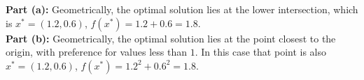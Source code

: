 \documentclass[11pt]{article}
\begin{document}
\begin{homeworkProblem}
\begin{figure}[hbpt!]

    \end{figure}

    \textbf{Part (a):} Geometrically, the optimal solution lies at the lower intersection, which is $x^* = (1.2, 0.6)$, $f(x^*) = 1.2 + 0.6 = 1.8$. \\

    \textbf{Part (b):} Geometrically, the optimal solution lies at the point closest to the origin, with preference for values less than $1$.
    In this case that point is also $x^* = (1.2, 0.6)$, $f(x^*) = 1.2^2 + 0.6^2 = 1.8$.
\end{homeworkProblem}

\pagebreak
\end{document}
